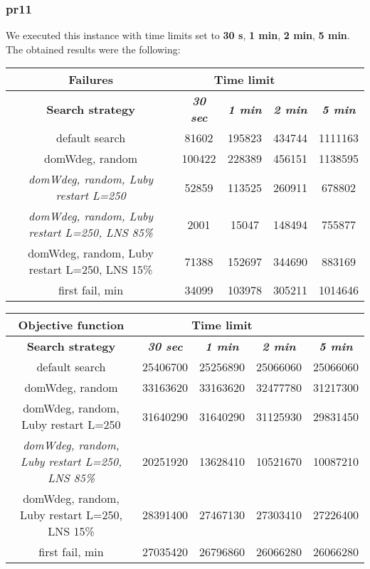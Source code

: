 \subsubsection{pr11}
We executed this instance with time limits set to \textbf{30 s}, \textbf{1 min}, \textbf{2 min}, \textbf{5 min}.\\
The obtained results were the following:
{
\renewcommand{\arraystretch}{2}
\begin{longtable}[h]{| c | c | c | c | c |}
    \hline
    \textbf{Failures} & \multicolumn{3}{c}{Time limit} & \\
    \hline
    \textbf{Search strategy} & \textbf{\textit{30 sec}} & \textbf{\textit{1 min}} & \textbf{\textit{2 min}} & \textbf{\textit{5 min}} \\
    \hline
    \endhead
    default search                                         &  81602 & 195823 & 434744 & 1111163 \\
    \hline
    domWdeg, random                                        & 100422 & 228389 & 456151 & 1138595 \\
    \hline
    \textit{domWdeg, random, Luby restart L=250}           &  52859 & 113525 & 260911 &  678802 \\
    \hline
    \textit{domWdeg, random, Luby restart L=250, LNS 85\%} &   2001 &  15047 & 148494 &  755877 \\
    \hline
    domWdeg, random, Luby restart L=250, LNS 15\%          &  71388 & 152697 & 344690 &  883169 \\
    \hline
    first fail, min                                        &  34099 & 103978 & 305211 & 1014646 \\
    \hline
\end{longtable}
}

{
\renewcommand{\arraystretch}{2}
\begin{longtable}[h]{| c | c | c | c | c |}
    \hline
    \textbf{Objective function} & \multicolumn{3}{c}{Time limit} & \\
    \hline
    \textbf{Search strategy} & \textbf{\textit{30 sec}} & \textbf{\textit{1 min}} & \textbf{\textit{2 min}} & \textbf{\textit{5 min}} \\
    \hline
    \endhead
    default search                                         & 25406700 & 25256890 & 25066060 & 25066060 \\
    \hline
    domWdeg, random                                        & 33163620 & 33163620 & 32477780 & 31217300 \\
    \hline
    domWdeg, random, Luby restart L=250                    & 31640290 & 31640290 & 31125930 & 29831450 \\
    \hline
    \textit{domWdeg, random, Luby restart L=250, LNS 85\%} & 20251920 & 13628410 & 10521670 & 10087210 \\
    \hline
    domWdeg, random, Luby restart L=250, LNS 15\%          & 28391400 & 27467130 & 27303410 & 27226400 \\
    \hline
    first fail, min                                        & 27035420 & 26796860 & 26066280 & 26066280 \\
    \hline
\end{longtable}
}